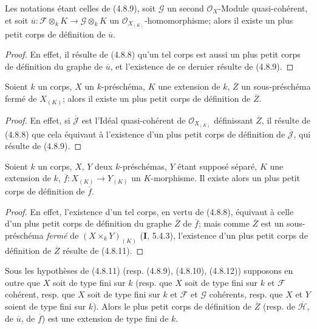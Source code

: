 \begin{corollary}[4.8.10]
\label{IV.2.4.8.10-fr}
Les notations étant celles de \textup{(4.8.9)}, soit $\mathscr G$ un second
$\mathcal O_X$-Module quasi-cohérent, et soit
$\overline u:\mathscr F\otimes_kK\to\mathscr G\otimes_kK$ un
$\mathcal O_{X_{(K)}}$-homomorphisme; alors il existe un plus petit corps de
définition de $\overline u$.
\end{corollary}


\begin{proof}
En effet, il résulte de (4.8.8) qu'un tel corps est aussi un plus petit corps
de définition du graphe de $\overline u$, et l'existence de ce dernier résulte
de (4.8.9).
\end{proof}

\begin{corollary}[4.8.11]
\label{IV.2.4.8.11-fr}
Soient $k$ un corps, $X$ un $k$-préschéma, $K$ une extension de $k$,
$\overline Z$ un sous-préschéma fermé de $X_{(K)}$; alors il existe un plus
petit corps de définition de $\overline Z$.
\end{corollary}

\begin{proof}
En effet, si $\overline{\mathscr J}$ est l'Idéal quasi-cohérent de
$\mathcal O_{X_{(K)}}$ définissant $\overline Z$, il résulte de (4.8.8) que
cela équivaut à l'existence d'un plus petit corps de définition de
$\overline{\mathscr J}$, qui résulte de (4.8.9).
\end{proof}

\begin{corollary}[4.8.12]
\label{IV.2.4.8.12-fr}
Soient $k$ un corps, $X$, $Y$ deux $k$-préschémas, $Y$ étant supposé séparé,
$K$ une extension de $k$, $\overline f:X_{(K)}\to Y_{(K)}$ un $K$-morphisme.
Il existe alors un plus petit corps de définition de $\overline f$.
\end{corollary}

\begin{proof}
En effet, l'existence d'un tel corps, en vertu de (4.8.8), équivaut à celle
d'un plus petit corps de définition du graphe $\overline Z$ de $\overline f$;
mais comme $\overline Z$ est un sous-préschéma \emph{fermé} de
$(X\times_kY)_{(K)}$ (\textbf{I}, 5.4.3), l'existence d'un plus petit corps de
définition de $\overline Z$ résulte de (4.8.11).
\end{proof}

\begin{proposition}[4.8.13]
\label{IV.2.4.8.13-fr}
Sous les hypothèses de \textup{(4.8.11) (resp. (4.8.9), (4.8.10), (4.8.12))}
supposons en outre que $X$ soit de type fini sur $k$ \textup{(resp.} que $X$ soit de
type fini sur $k$ et $\mathscr F$ cohérent, \textup{resp.} que $X$ soit de type fini
sur $k$ et $\mathscr F$ et $\mathscr G$ cohérents, \textup{resp.} que $X$ et $Y$
soient de type fini sur $k$\textup{)}. Alors le plus petit corps de définition de
$\overline Z$ \textup{(resp.} de $\overline{\mathscr H}$, de $\overline u$, de $\overline f$\textup{)} est
une extension de type fini de $k$.
\end{proposition}

